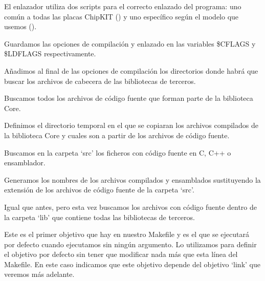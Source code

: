  
 El enlazador utiliza dos scripts para el correcto enlazado del programa: uno común a todas las placas ChipKIT () y uno específico según el modelo que usemos ().
 
 
 Guardamos las opciones de compilación y enlazado en las variables \$CFLAGS y \$LDFLAGS respectivamente.
 
 
 Añadimos al final de las opciones de compilación los directorios donde habrá que buscar los archivos de cabecera de las bibliotecas de terceros.


Buscamos todos los archivos de código fuente que forman parte de la biblioteca Core.
 

 Definimos el directorio temporal en el que se copiaran los archivos compilados de la biblioteca Core y cuales son a partir de los archivos de código fuente.
 
 
 Buscamos en la carpeta `src' los ficheros con código fuente en C, C++ o ensamblador.

 
 Generamos los nombres de los archivos compilados y ensamblados sustituyendo la extensión de los archivos de código fuente de la carpeta `src'.
 
 
 Igual que antes, pero esta vez buscamos los archivos con código fuente dentro de la carpeta `lib' que contiene todas las bibliotecas de terceros.
 
 
 Este es el primer objetivo que hay en nuestro Makefile y es el que se ejecutará por defecto cuando ejecutamos  sin ningún argumento. Lo utilizamos para definir el objetivo por defecto sin tener que modificar nada más que esta línea del Makefile. En este caso indicamos que este objetivo depende del objetivo `link' que veremos más adelante.
 

